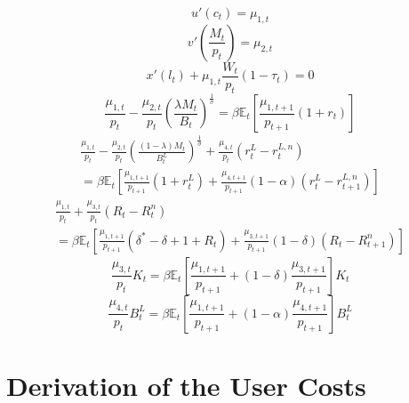 \documentclass[11pt,a4paper,margin=1.5in]{article}
\begin{document}
\begin{equation}
	u'(c_t) = \mu_{1,t}
	\label{eq:HH_OC_c}
\end{equation}
%
\begin{equation}
	v'\left(\frac{M_t}{p_t}\right) = \mu_{2,t}
	\label{eq:HH_OC_M}
\end{equation}
%
\begin{equation}
	x'(l_t) + \mu_{1,t} \frac{W_t}{p_t} (1-\tau_t) = 0
	\label{eq:HH_OC_l}
\end{equation}
%
\begin{equation}
	\frac{\mu_{1,t}}{p_t} - \frac{\mu_{2,t}}{p_t}\left(\frac{\lambda M_t}{B_t}\right)^{\frac{1}{\sigma}} = \beta\mathbb{E}_t\!\left[\frac{\mu_{1,t+1}}{p_{t+1}}(1+r_t)\right]
	\label{eq:HH_OC_B}
\end{equation}
%
\begin{multline}
	\frac{\mu_{1,t}}{p_t} - \frac{\mu_{2,t}}{p_t}\left(\frac{(1-\lambda) M_t}{B^L_t}\right)^{\frac{1}{\sigma}} + \frac{\mu_{4,t}}{p_t}\left(r^L_t - r^{L,n}_t\right) \\ = \beta\mathbb{E}_t\!\left[\frac{\mu_{1,t+1}}{p_{t+1}}(1+r^L_{t}) + \frac{\mu_{4,{t+1}}}{p_{t+1}}(1-\alpha)\left(r^L_{t} - r^{L,n}_{t+1}\right)\right] 
	\label{eq:HH_OC_BL}
\end{multline}
%
\begin{multline}
	\frac{\mu_{1,t}}{p_t} + \frac{\mu_{3,t}}{p_t}\left(R_t - R^{n}_t\right) \\ = \beta\mathbb{E}_t\!\left[\frac{\mu_{1,t+1}}{p_{t+1}}(\delta^*- \delta + 1 + R_{t}) + \frac{\mu_{3,{t+1}}}{p_{t+1}}(1-\delta)\left(R_{t} - R^{n}_{t+1}\right)\right]
	\label{eq:HH_OC_K}
\end{multline}
%
\begin{equation}
	\frac{\mu_{3,t}}{p_t}K_t = \beta\mathbb{E}_t\!\left[\frac{\mu_{1,t+1}}{p_{t+1}} + (1-\delta)\frac{\mu_{3,{t+1}}}{p_{t+1}}\right]K_t
	\label{eq:HH_OC_R}
\end{equation}
%
\begin{equation}
	\frac{\mu_{4,t}}{p_t}B^L_t = \beta\mathbb{E}_t\!\left[\frac{\mu_{1,t+1}}{p_{t+1}} + (1-\alpha)\frac{\mu_{4,{t+1}}}{p_{t+1}}\right]B^L_t
	\label{eq:HH_OC_rL}
\end{equation}

\newpage
\section{Derivation of the User Costs}
\label{app:usercost_derivation}
\end{document}
